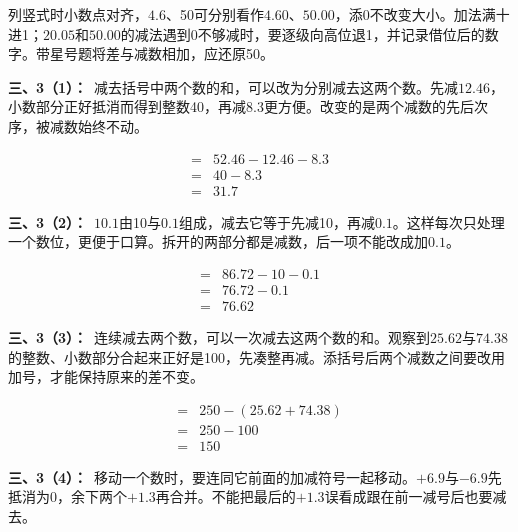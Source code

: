 \documentclass[multi=snippet,border=0pt]{standalone}
\newenvironment{snippet}[3]{\begin{minipage}{#1bp}\color{answerred}\fontsize{#2}{#3}\selectfont\raggedright}{\end{minipage}}
\begin{document}
\begin{snippet}{505}{11.5}{14}列竖式时小数点对齐，\(4.6\)、50可分别看作\(4.60\)、\(50.00\)，添0不改变大小。加法满十进1；\(20.05\)和\(50.00\)的减法遇到0不够减时，要逐级向高位退1，并记录借位后的数字。带星号题将差与减数相加，应还原50。\end{snippet}
\begin{snippet}{505}{11.5}{14}\textbf{三、3（1）：}\ 减去括号中两个数的和，可以改为分别减去这两个数。先减\(12.46\)，小数部分正好抵消而得到整数40，再减\(8.3\)更方便。改变的是两个减数的先后次序，被减数始终不动。\end{snippet}
\begin{snippet}{195.00000000000003}{10.5}{12.8}\[\begin{aligned}={}&52.46-12.46-8.3\\={}&40-8.3\\={}&31.7\end{aligned}\]\end{snippet}
\begin{snippet}{505}{11.5}{14}\textbf{三、3（2）：}\ \(10.1\)由10与\(0.1\)组成，减去它等于先减10，再减\(0.1\)。这样每次只处理一个数位，更便于口算。拆开的两部分都是减数，后一项不能改成加\(0.1\)。\end{snippet}
\begin{snippet}{217.0}{10.5}{12.8}\[\begin{aligned}={}&86.72-10-0.1\\={}&76.72-0.1\\={}&76.62\end{aligned}\]\end{snippet}
\begin{snippet}{505}{11.5}{14}\textbf{三、3（3）：}\ 连续减去两个数，可以一次减去这两个数的和。观察到\(25.62\)与\(74.38\)的整数、小数部分合起来正好是100，先凑整再减。添括号后两个减数之间要改用加号，才能保持原来的差不变。\end{snippet}
\begin{snippet}{196.00000000000003}{10.5}{12.8}\[\begin{aligned}={}&250-(25.62+74.38)\\={}&250-100\\={}&150\end{aligned}\]\end{snippet}
\begin{snippet}{505}{11.5}{14}\textbf{三、3（4）：}\ 移动一个数时，要连同它前面的加减符号一起移动。\(+6.9\)与\(-6.9\)先抵消为0，余下两个\(+1.3\)再合并。不能把最后的\(+1.3\)误看成跟在前一减号后也要减去。\end{snippet}
\end{document}
